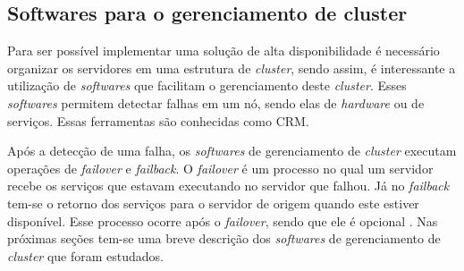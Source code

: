 

\subsection{Softwares para o gerenciamento de cluster}
\label{section:toolcluster}

Para ser possível implementar uma solução de alta disponibilidade é necessário organizar os servidores em uma estrutura de \textit{cluster},
sendo assim, é interessante a utilização de \textit{softwares} que facilitam o gerenciamento deste \textit{cluster}. Esses \textit{softwares} 
permitem detectar falhas em um nó, sendo elas de \textit{hardware} ou de serviços. Essas ferramentas são conhecidas como \ac{CRM}. 

Após a detecção de uma falha, os \textit{softwares} de gerenciamento de \textit{cluster} executam operações de \textit{failover} e 
\textit{failback}. O \textit{failover} é um processo no qual um servidor recebe os serviços que estavam executando no servidor que falhou. 
Já no \textit{failback} tem-se o retorno dos serviços para o servidor de origem quando este estiver disponível. Esse processo ocorre após o 
\textit{failover}, sendo que ele é opcional \cite{bassan2008}. Nas próximas seções tem-se uma breve descrição dos \textit{softwares} de 
gerenciamento de \textit{cluster} que foram estudados.


